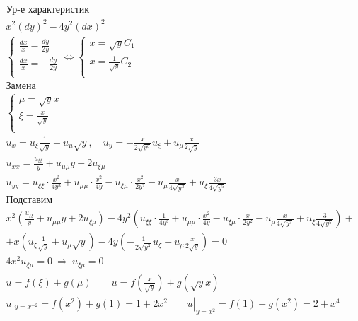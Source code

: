 \begin{gather*}
  \text{Ур-е характеристик} \\
  x^{2}(dy)^{2}-4y^{2}(dx)^{2} \\
  \begin{cases}
    \frac{dx}{x} = \frac{dy}{2y} \\ \frac{dx}{x}= - \frac{dy}{2y} \\
  \end{cases} \Leftrightarrow
  \begin{cases}
    x = \sqrt{y}C_{1} \\ x = \frac{1}{\sqrt{y}}C_{2} \\
  \end{cases} \\
  \text{Замена} \\
  \begin{cases}
    \mu =\sqrt{y}x \\ \xi =\frac{x}{\sqrt{y}} \\
  \end{cases} \\
  u_{x}=u_{\xi} \frac{1}{\sqrt{y}}+ u_{\mu}\sqrt{y}, \quad u_{y}= - 
  \frac{x}{2 \sqrt{y^{3}}}u_{\xi} + u_{\mu} \frac{x}{2 \sqrt{y}} \\
  u_{xx}= \frac{u_{\xi \xi}}{y} + u_{\mu \mu} y + 2 u_{\xi \mu} \\
  u_{yy}=u_{\xi \xi} \cdot \frac{x^{2}}{4y^{3}} + u_{\mu \mu} \cdot \frac{x^{2}}{4y} - u_{\xi \mu}
  \cdot \frac{x^{2}}{2 y^{2}} - u_{\mu} \frac{x}{4 \sqrt{y^{3}}} + u_{\xi} \frac{3x}{4 \sqrt{y^{5}}} \\
  \text{Подставим} \\
  x^{2}(\frac{u_{\xi \xi}}{y} + u_{\mu \mu} y + 2 u_{\xi \mu})-4y^{2}(u_{\xi \xi} \cdot \frac{1}{4y^{3}} + u_{\mu \mu} \cdot \frac{x^{2}}{4y} - u_{\xi \mu}
  \cdot \frac{x}{2 y^{2}} - u_{\mu} \frac{x}{4 \sqrt{y^{3}}} + u_{\xi} \frac{3}{4 \sqrt{y^{5}}}) +\\
  +x(u_{\xi} \frac{1}{\sqrt{y}}+ u_{\mu}\sqrt{y})-4y(- 
  \frac{1}{2 \sqrt{y^{3}}}u_{\xi} + u_{\mu} \frac{x}{2 \sqrt{y}} ) = 0 \\
  4x^{2}u_{\xi\mu}=0 \ \Rightarrow \ u_{\xi\mu}=0 \\
  u = f(\xi)+g(\mu) \qquad u = f(\frac{x}{\sqrt{y}})+g(\sqrt{y}x) \\
  u|_{y=x^{-2}}=f(x^{2})+g(1)=1+2x^{2} \qquad u|_{y=x^{2}}=f(1)+g(x^{2})=2+x^{4} \\
\end{gather*} \\
